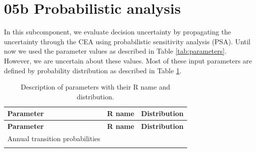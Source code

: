 \documentclass[]{book}
\begin{document}
\section{05b Probabilistic analysis}\label{Probabilistic-analysis}

In this subcomponent, we evaluate decision uncertainty by propagating
the uncertainty through the CEA using probabilistic sensitivity analysis
(PSA). Until now we used the parameter values as described in Table
\ref{tab:parameters}. However, we are uncertain about these values. Most
of these input parameters are defined by probability distribution as
described in Table \ref{tab:parameters-PSA}.

\begin{longtable}[]{@{}lcc@{}}
\caption{\label{tab:parameters-PSA} Description of parameters with their R
name and distribution.}\tabularnewline
\toprule
\begin{minipage}[b]{0.43\columnwidth}\raggedright\strut
\textbf{Parameter}\strut
\end{minipage} & \begin{minipage}[b]{0.18\columnwidth}\centering\strut
\textbf{R name}\strut
\end{minipage} & \begin{minipage}[b]{0.20\columnwidth}\centering\strut
\textbf{Distribution}\strut
\end{minipage}\tabularnewline
\midrule
\endfirsthead
\toprule
\begin{minipage}[b]{0.43\columnwidth}\raggedright\strut
\textbf{Parameter}\strut
\end{minipage} & \begin{minipage}[b]{0.18\columnwidth}\centering\strut
\textbf{R name}\strut
\end{minipage} & \begin{minipage}[b]{0.20\columnwidth}\centering\strut
\textbf{Distribution}\strut
\end{minipage}\tabularnewline
\midrule
\endhead
\begin{minipage}[t]{0.43\columnwidth}\raggedright\strut
Annual transition probabilities\strut
\end{minipage} & \begin{minipage}[t]{0.18\columnwidth}\centering\strut
\strut
\end{minipage} & \begin{minipage}[t]{0.20\columnwidth}\centering\strut
\strut
\end{minipage}\tabularnewline
\begin{minipage}[t]{0.43\columnwidth}\raggedright\strut

\end{minipage}
\end{longtable}
\end{document}
